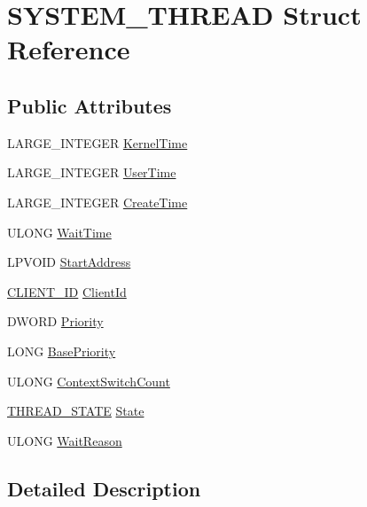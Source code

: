 \hypertarget{structSYSTEM__THREAD}{\section{S\-Y\-S\-T\-E\-M\-\_\-\-T\-H\-R\-E\-A\-D Struct Reference}
\label{structSYSTEM__THREAD}
}
\subsection*{Public Attributes}
\begin{DoxyCompactItemize}
\item 
L\-A\-R\-G\-E\-\_\-\-I\-N\-T\-E\-G\-E\-R \hyperlink{structSYSTEM__THREAD_ad7375c33040d6ddb6571c3af81435b77}{Kernel\-Time}
\item 
L\-A\-R\-G\-E\-\_\-\-I\-N\-T\-E\-G\-E\-R \hyperlink{structSYSTEM__THREAD_a184e75552dfdee4dff101e7157fd490e}{User\-Time}
\item 
L\-A\-R\-G\-E\-\_\-\-I\-N\-T\-E\-G\-E\-R \hyperlink{structSYSTEM__THREAD_adcf5aa5b87a05efdae50ecf5109a3357}{Create\-Time}
\item 
U\-L\-O\-N\-G \hyperlink{structSYSTEM__THREAD_ab2667faeff575d5a37ff360237e1d65e}{Wait\-Time}
\item 
L\-P\-V\-O\-I\-D \hyperlink{structSYSTEM__THREAD_a30ad044660735115374fc57eceef20a0}{Start\-Address}
\item 
\hyperlink{structCLIENT__ID}{C\-L\-I\-E\-N\-T\-\_\-\-I\-D} \hyperlink{structSYSTEM__THREAD_aa71e5a8c78ecfb8b9508ab715d723fda}{Client\-Id}
\item 
D\-W\-O\-R\-D \hyperlink{structSYSTEM__THREAD_a5f52ff03bd023ee94543184b9ff098b2}{Priority}
\item 
L\-O\-N\-G \hyperlink{structSYSTEM__THREAD_ada7deae87a563f8523322c2f3751cd95}{Base\-Priority}
\item 
U\-L\-O\-N\-G \hyperlink{structSYSTEM__THREAD_a7b6868bf760ee7bccf074b71537356c8}{Context\-Switch\-Count}
\item 
\hyperlink{z__Windows__NT__util_8c_a39a3627827e25e3c5ab63a617bad3ad4}{T\-H\-R\-E\-A\-D\-\_\-\-S\-T\-A\-T\-E} \hyperlink{structSYSTEM__THREAD_ac2999f6615545dd16388e7d60280a456}{State}
\item 
U\-L\-O\-N\-G \hyperlink{structSYSTEM__THREAD_aa4017ed1b6684d56d00778f09696b1f4}{Wait\-Reason}
\end{DoxyCompactItemize}


\subsection{Detailed Description}


